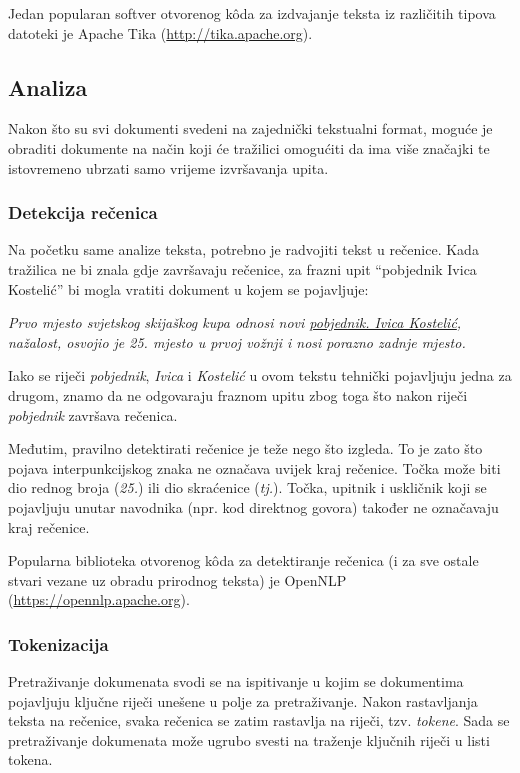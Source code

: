 \documentclass[a4paper,twoside,12pt]{scrreprt}
\begin{document}
Jedan popularan softver otvorenog kôda za izdvajanje teksta iz različitih tipova datoteki je Apache Tika (\url{http://tika.apache.org}).

\subsection{Analiza}

Nakon što su svi dokumenti svedeni na zajednički tekstualni format, moguće je obraditi dokumente na način koji će tražilici omogućiti da ima više značajki te istovremeno ubrzati samo vrijeme izvršavanja upita.

\subsubsection{Detekcija rečenica}

Na početku same analize teksta, potrebno je radvojiti tekst u rečenice. Kada tražilica ne bi znala gdje završavaju rečenice, za frazni upit ``pobjednik Ivica Kostelić'' bi mogla vratiti dokument u kojem se pojavljuje:

\begin{quoting}
  \textit{Prvo mjesto svjetskog skijaškog kupa odnosi novi \underline{pobjednik. Ivica Kostelić}, nažalost, osvojio je 25. mjesto u prvoj vožnji i nosi porazno zadnje mjesto.}
\end{quoting}

Iako se riječi \textit{pobjednik}, \textit{Ivica} i \textit{Kostelić} u ovom tekstu tehnički pojavljuju jedna za drugom, znamo da ne odgovaraju fraznom upitu zbog toga što nakon riječi \textit{pobjednik} završava rečenica.

Međutim, pravilno detektirati rečenice je teže nego što izgleda. To je zato što pojava interpunkcijskog znaka ne označava uvijek kraj rečenice. Točka može biti dio rednog broja (\textit{25.}) ili dio skraćenice (\textit{tj.}). Točka, upitnik i uskličnik koji se pojavljuju unutar navodnika (npr. kod direktnog govora) također ne označavaju kraj rečenice.

Popularna biblioteka otvorenog kôda za detektiranje rečenica (i za sve ostale stvari vezane uz obradu prirodnog teksta) je OpenNLP (\url{https://opennlp.apache.org}).

\subsubsection{Tokenizacija}

Pretraživanje dokumenata svodi se na ispitivanje u kojim se dokumentima pojavljuju ključne riječi unešene u polje za pretraživanje. Nakon rastavljanja teksta na rečenice, svaka rečenica se zatim rastavlja na riječi, tzv. \textit{tokene}. Sada se pretraživanje dokumenata može ugrubo svesti na traženje ključnih riječi u listi tokena.
\end{document}
